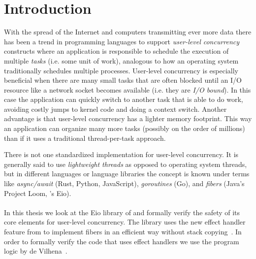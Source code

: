 \section{Introduction}
\label{sec:introduction}

With the spread of the Internet and computers transmitting ever more data there has been a trend in programming languages to support \emph{user-level concurrency} constructs
where an application is responsible to schedule the execution of multiple \emph{tasks} (i.e. some unit of work), analogous to how an operating system traditionally schedules multiple processes.
User-level concurrency is especially beneficial when there are many small tasks that are often blocked until an I/O resource like a network socket becomes available (i.e. they are \emph{I/O bound}).
In this case the application can quickly switch to another task that is able to do work, avoiding costly jumps to kernel code and doing a context switch.
Another advantage is that user-level concurrency has a lighter memory footprint.
This way an application can organize many more tasks (possibly on the order of millions) than if it uses a traditional thread-per-task approach.

There is not one standardized implementation for user-level concurrency.
It is generally said to use \emph{lightweight threads} as opposed to operating system threads, but in different languages or language libraries the concept is known under terms
like \emph{async/await} (Rust, Python, JavaScript), \emph{goroutines} (Go), and \emph{fibers} (Java's Project Loom, \ocf{}'s Eio).

\paragraph{}

In this thesis we look at the Eio library of \ocf{} and formally verify the safety of its core elements for user-level concurrency.
The library uses the new effect handler feature from \ocf{} to implement fibers in an efficient way without stack copying~\cite{ocamleff}.
In order to formally verify the code that uses effect handlers we use the \hazel{} program logic by de Vilhena~\cite{de2021separation,de2022proof}.

